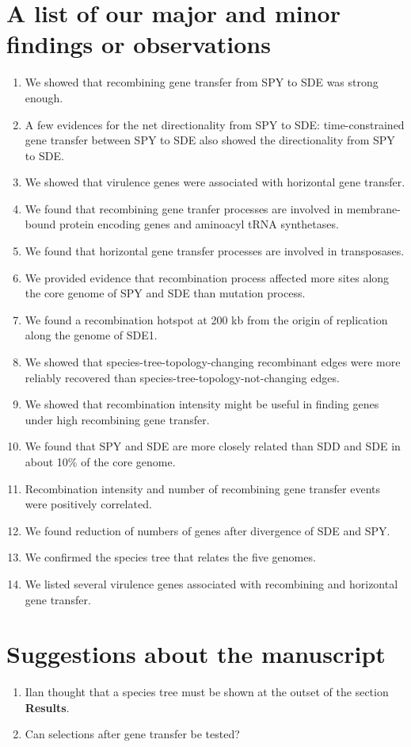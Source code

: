 \documentclass[10pt]{article}
\begin{document}
\section*{A list of our major and minor findings or observations}
\begin{enumerate}
\item We showed that recombining gene transfer from SPY to SDE was strong
enough.
\item A few evidences for the net directionality from SPY to SDE:
time-constrained gene transfer between SPY to SDE also showed the directionality
from SPY to SDE.
\item We showed that virulence genes were associated with horizontal gene
transfer. 
\item We found that recombining gene tranfer processes are involved in
membrane-bound protein encoding genes and aminoacyl tRNA synthetases.
\item We found that horizontal gene transfer processes are involved in
transposases.
\item We provided evidence that recombination process affected more sites along
the core genome of SPY and SDE than mutation process.
\item We found a recombination hotspot at 200 kb from the origin of replication
along the genome of SDE1.
\item We showed that species-tree-topology-changing recombinant edges were more
reliably recovered than species-tree-topology-not-changing edges.
\item We showed that recombination intensity might be useful in finding genes
under high recombining gene transfer.
\item We found that SPY and SDE are more closely related than SDD and SDE in
about 10\% of the core genome.
\item Recombination intensity and number of recombining gene transfer events
were positively correlated.
\item We found reduction of numbers of genes after divergence of SDE and SPY.
\item We confirmed the species tree that relates the five genomes.
\item We listed several virulence genes associated with recombining and
horizontal gene transfer.
\end{enumerate}

\section*{Suggestions about the manuscript}
\begin{enumerate}
\item Ilan thought that a species tree must be shown at the outset of the
section \textbf{Results}.
\item Can selections after gene transfer be tested?
\end{enumerate}
\end{document}
